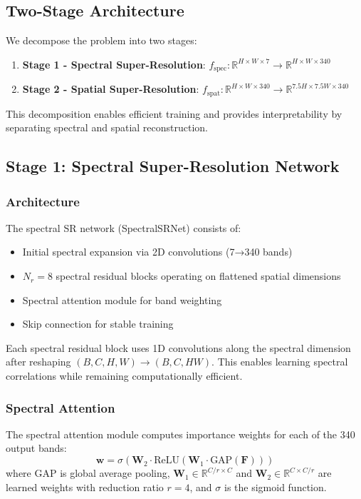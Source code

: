 \documentclass[]{spieman}
\begin{document}
\subsection{Two-Stage Architecture}

We decompose the problem into two stages:
\begin{enumerate}
\item \textbf{Stage 1 - Spectral Super-Resolution}: $f_{\text{spec}}: \mathbb{R}^{H \times W \times 7} \rightarrow \mathbb{R}^{H \times W \times 340}$
\item \textbf{Stage 2 - Spatial Super-Resolution}: $f_{\text{spat}}: \mathbb{R}^{H \times W \times 340} \rightarrow \mathbb{R}^{7.5H \times 7.5W \times 340}$
\end{enumerate}

This decomposition enables efficient training and provides interpretability by separating spectral and spatial reconstruction.

\subsection{Stage 1: Spectral Super-Resolution Network}

\subsubsection{Architecture}

The spectral SR network (SpectralSRNet) consists of:
\begin{itemize}
\item Initial spectral expansion via 2D convolutions (7→340 bands)
\item $N_r=8$ spectral residual blocks operating on flattened spatial dimensions
\item Spectral attention module for band weighting
\item Skip connection for stable training
\end{itemize}

Each spectral residual block uses 1D convolutions along the spectral dimension after reshaping $(B, C, H, W) \rightarrow (B, C, HW)$. This enables learning spectral correlations while remaining computationally efficient.

\subsubsection{Spectral Attention}

The spectral attention module computes importance weights for each of the 340 output bands:
\begin{equation}
\mathbf{w} = \sigma(\mathbf{W}_2 \cdot \text{ReLU}(\mathbf{W}_1 \cdot \text{GAP}(\mathbf{F})))
\end{equation}
where GAP is global average pooling, $\mathbf{W}_1 \in \mathbb{R}^{C/r \times C}$ and $\mathbf{W}_2 \in \mathbb{R}^{C \times C/r}$ are learned weights with reduction ratio $r=4$, and $\sigma$ is the sigmoid function.
\end{document}
